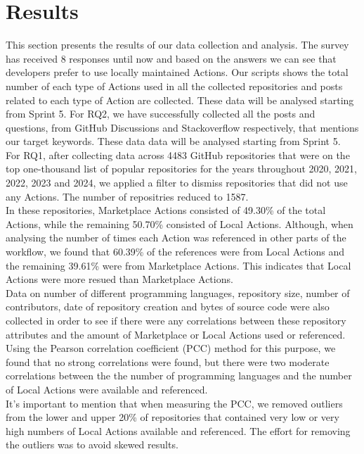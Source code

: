 \documentclass[conference]{IEEEtran}
\begin{document}

\section{Results}
    This section presents the results of our data collection and analysis.
    The survey has received 8 responses until now and based on the answers we can see that developers prefer to use locally maintained Actions. Our scripts shows the total number of each type of Actions used in all the collected repositories and posts related to each type of Action are collected. These data will be analysed starting from Sprint 5.
    For RQ2, we have successfully collected all the posts and questions, from GitHub Discussions and Stackoverflow respectively, that mentions our target keywords. These data data will be analysed starting from Sprint 5.
    \\

    For RQ1, after collecting data across 4483 GitHub repositories that were on the top one-thousand list of popular repositories for the years throughout 2020, 2021, 2022, 2023 and 2024, we applied a filter to dismiss repositories that did not use any Actions. The number of repositries reduced to 1587. \\ 
    In these repositories, Marketplace Actions consisted of 49.30\% of the total Actions, while the remaining 50.70\% consisted of Local Actions. Although, when analysing the number of times each Action was referenced in other parts of the workflow, we found that 60.39\% of the references were from Local Actions and the remaining 39.61\% were from Marketplace Actions. This indicates that Local Actions were more resued than Marketplace Actions. 
    \\

    Data on number of different programming languages, repository size, number of contributors, date of repository creation and bytes of source code were also collected in order to see if there were any correlations between these repository attributes and the amount of Marketplace or Local Actions used or referenced.\\
    Using the Pearson correlation coefficient (PCC) method for this purpose, we found that no strong correlations were found, but there were two moderate correlations between the the number of programming languages and the number of Local Actions were available and referenced. \\
    It's important to mention that when measuring the PCC, we removed outliers from the lower and upper 20\% of repositories that contained very low or very high numbers of Local Actions available and referenced. The effort for removing the outliers was to avoid skewed results. \\
\end{document}
